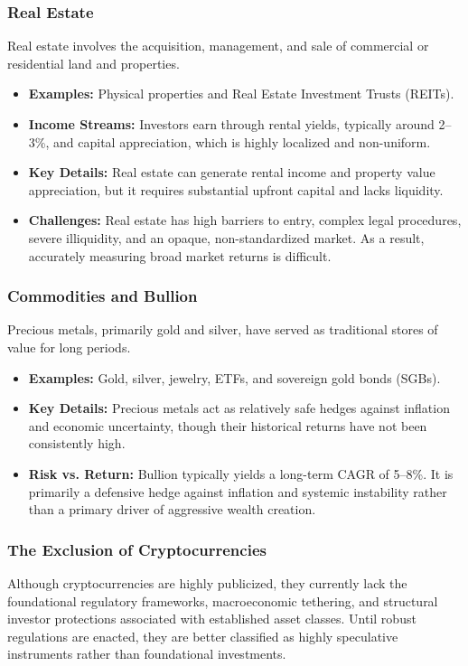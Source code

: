 \documentclass[12pt,openany]{book}
\begin{document}
\subsubsection{Real Estate}
Real estate involves the acquisition, management, and sale of commercial or residential land and properties.

\begin{itemize}[leftmargin=*]
    \item \textbf{Examples:} Physical properties and Real Estate Investment Trusts (REITs).
    \item \textbf{Income Streams:} Investors earn through rental yields, typically around 2--3\%, and capital appreciation, which is highly localized and non-uniform.
    \item \textbf{Key Details:} Real estate can generate rental income and property value appreciation, but it requires substantial upfront capital and lacks liquidity.
    \item \textbf{Challenges:} Real estate has high barriers to entry, complex legal procedures, severe illiquidity, and an opaque, non-standardized market. As a result, accurately measuring broad market returns is difficult.
\end{itemize}

\subsubsection{Commodities and Bullion}
Precious metals, primarily gold and silver, have served as traditional stores of value for long periods.

\begin{itemize}[leftmargin=*]
    \item \textbf{Examples:} Gold, silver, jewelry, ETFs, and sovereign gold bonds (SGBs).
    \item \textbf{Key Details:} Precious metals act as relatively safe hedges against inflation and economic uncertainty, though their historical returns have not been consistently high.
    \item \textbf{Risk vs. Return:} Bullion typically yields a long-term CAGR of 5--8\%. It is primarily a defensive hedge against inflation and systemic instability rather than a primary driver of aggressive wealth creation.
\end{itemize}

\subsubsection{The Exclusion of Cryptocurrencies}
Although cryptocurrencies are highly publicized, they currently lack the foundational regulatory frameworks, macroeconomic tethering, and structural investor protections associated with established asset classes. Until robust regulations are enacted, they are better classified as highly speculative instruments rather than foundational investments.
\end{document}
